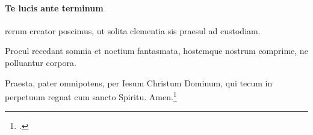 

\paragraph{Te lucis ante terminum}
rerum creator poscimus,
ut solita clementia
sis praesul ad custodiam.

Procul recedant somnia
et noctium fantasmata,
hostemque nostrum comprime,
ne polluantur corpora.

Praesta, pater omnipotens,
per Iesum Christum Dominum,
qui tecum in perpetuum
regnat cum sancto Spiritu.
Amen.\footcite[53r]{bp1502}
